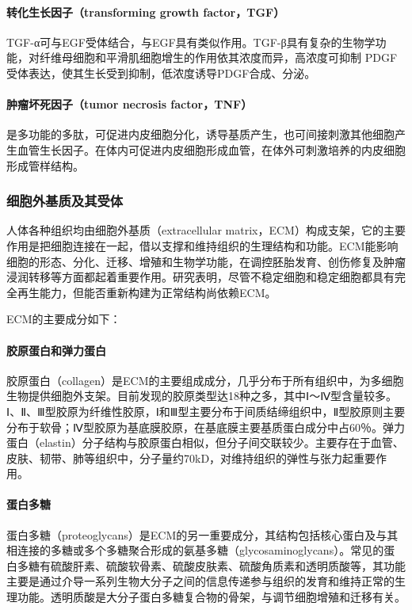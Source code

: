 \paragraph{转化生长因子（transforming growth factor，TGF）}
TGF-α可与EGF受体结合，与EGF具有类似作用。TGF-β具有复杂的生物学功能，对纤维母细胞和平滑肌细胞增生的作用依其浓度而异，高浓度可抑制
PDGF受体表达，使其生长受到抑制，低浓度诱导PDGF合成、分泌。

\paragraph{肿瘤坏死因子（tumor necrosis factor，TNF）}
是多功能的多肽，可促进内皮细胞分化，诱导基质产生，也可间接刺激其他细胞产生血管生长因子。在体内可促进内皮细胞形成血管，在体外可刺激培养的内皮细胞形成管样结构。

\subsubsection{细胞外基质及其受体}

人体各种组织均由细胞外基质（extracellular
matrix，ECM）构成支架，它的主要作用是把细胞连接在一起，借以支撑和维持组织的生理结构和功能。ECM能影响细胞的形态、分化、迁移、增殖和生物学功能，在调控胚胎发育、创伤修复及肿瘤浸润转移等方面都起着重要作用。研究表明，尽管不稳定细胞和稳定细胞都具有完全再生能力，但能否重新构建为正常结构尚依赖ECM。

ECM的主要成分如下：

\paragraph{胶原蛋白和弹力蛋白}
胶原蛋白（collagen）是ECM的主要组成成分，几乎分布于所有组织中，为多细胞生物提供细胞外支架。目前发现的胶原类型达18种之多，其中Ⅰ～Ⅳ型含量较多。Ⅰ、Ⅱ、Ⅲ型胶原为纤维性胶原，Ⅰ和Ⅲ型主要分布于间质结缔组织中，Ⅱ型胶原则主要分布于软骨；Ⅳ型胶原为基底膜胶原，在基底膜主要基质蛋白成分中占60％。弹力蛋白（elastin）分子结构与胶原蛋白相似，但分子间交联较少。主要存在于血管、皮肤、韧带、肺等组织中，分子量约70kD，对维持组织的弹性与张力起重要作用。

\paragraph{蛋白多糖}
蛋白多糖（proteoglycans）是ECM的另一重要成分，其结构包括核心蛋白及与其相连接的多糖或多个多糖聚合形成的氨基多糖（glycosaminoglycans）。常见的蛋白多糖有硫酸肝素、硫酸软骨素、硫酸皮肤素、硫酸角质素和透明质酸等，其功能主要是通过介导一系列生物大分子之间的信息传递参与组织的发育和维持正常的生理功能。透明质酸是大分子蛋白多糖复合物的骨架，与调节细胞增殖和迁移有关。

